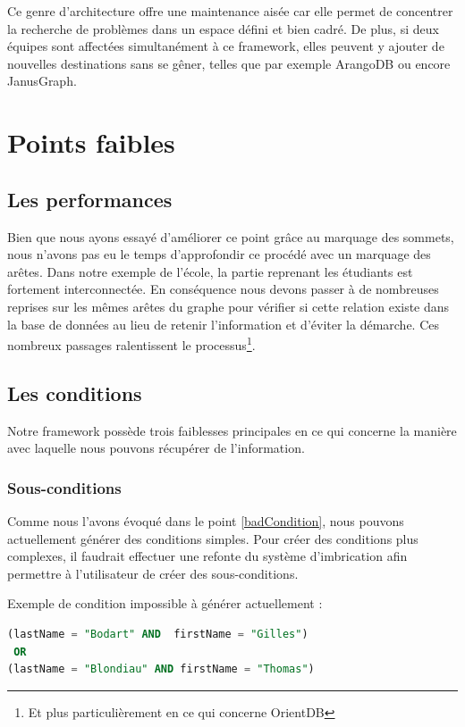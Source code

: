 \documentclass[a4paper,fleqn,12pt,oneside]{report}
\begin{document}
Ce genre d'architecture offre une maintenance aisée car elle permet de concentrer la recherche de problèmes dans un espace défini et bien cadré. De plus, si deux équipes sont affectées simultanément à ce framework, elles peuvent y ajouter de nouvelles destinations sans se gêner, telles que par exemple ArangoDB\cite{arangoSite} ou encore JanusGraph\cite{janusGraphSite}. 


\section{Points faibles}
\subsection{Les performances}

Bien que nous ayons essayé d'améliorer ce point grâce au marquage des sommets, nous n'avons pas eu le temps d'approfondir ce procédé avec un marquage des arêtes. Dans notre exemple de l'école, la partie reprenant les étudiants est fortement interconnectée. En conséquence nous devons passer à de nombreuses reprises sur les mêmes arêtes du graphe pour vérifier si cette relation existe dans la base de données au lieu de retenir l'information et d'éviter la démarche. Ces nombreux passages ralentissent le processus\footnote{Et plus particulièrement en ce qui concerne OrientDB}.

\subsection{Les conditions}

Notre framework possède trois faiblesses principales en ce qui concerne la manière avec laquelle nous pouvons récupérer de l'information.

\subsubsection*{\bf Sous-conditions}

Comme nous l'avons évoqué dans le point \ref{badCondition}, nous pouvons actuellement générer des conditions simples.
Pour créer des conditions plus complexes, il faudrait effectuer une refonte du système d'imbrication afin permettre à l'utilisateur de créer des sous-conditions. 

Exemple de condition impossible à générer actuellement :
\begin{lstlisting}[language=SQL]
(lastName = "Bodart" AND  firstName = "Gilles") 
 OR 
(lastName = "Blondiau" AND firstName = "Thomas")
\end{lstlisting}
\end{document}
